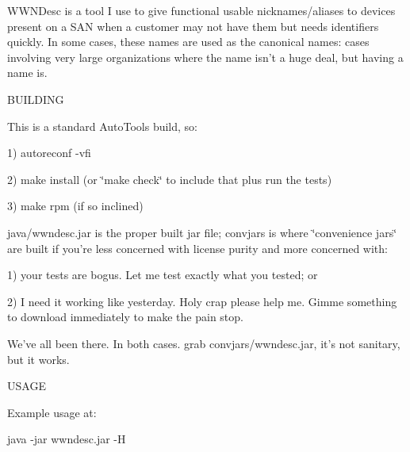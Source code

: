 \-W\-W\-N\-Desc is a tool \-I use to give functional usable nicknames/aliases to devices present on a \-S\-A\-N when a customer may not have them but needs identifiers quickly. \-In some cases, these names are used as the canonical names\-: cases involving very large organizations where the name isn't a huge deal, but having a name is.

\-B\-U\-I\-L\-D\-I\-N\-G

\-This is a standard \-Auto\-Tools build, so\-:

1) autoreconf -\/vfi

2) make install (or \char`\"{}make check\char`\"{} to include that plus run the tests)

3) make rpm (if so inclined)

java/wwndesc.\-jar is the proper built jar file; convjars is where \char`\"{}convenience jars\char`\"{} are built if you're less concerned with license purity and more concerned with\-:

1) your tests are bogus. \-Let me test exactly what you tested; or

2) \-I need it working like yesterday. \-Holy crap please help me. \-Gimme something to download immediately to make the pain stop.

\-We've all been there. \-In both cases. grab convjars/wwndesc.\-jar, it's not sanitary, but it works.

\-U\-S\-A\-G\-E

\-Example usage at\-:

java -\/jar wwndesc.\-jar -\/\-H 